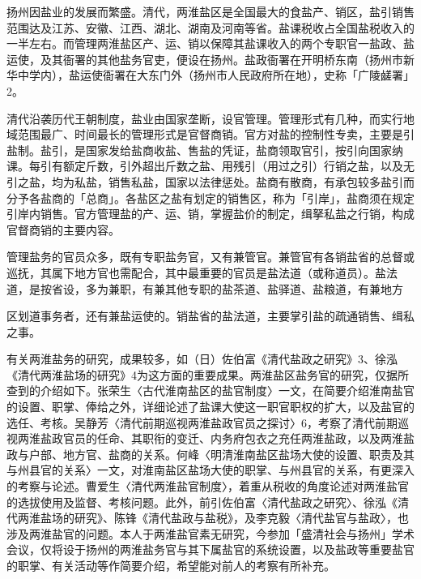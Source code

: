 扬州因盐业的发展而繁盛。清代，两淮盐区是全国最大的食盐产、销区，盐引销售范围达及江苏、安徽、江西、湖北、湖南及河南等省。盐课税收占全国盐税收入的一半左右。而管理两淮盐区产、运、销以保障其盐课收入的两个专职官一盐政、盐运使，及其衙署的其他盐务官吏，便设在扬州。盐政衙署在开明桥东南（扬州市新华中学内），盐运使衙署在大东门外（扬州市人民政府所在地），史称「广陵鹾署」2。

清代沿袭历代王朝制度，盐业由国家垄断，设官管理。管理形式有几种，而实行地域范围最广、时间最长的管理形式是官督商销。官方对盐的控制性专卖，主要是引盐制。盐引，是国家发给盐商收盐、售盐的凭证，盐商领取官引，按引向国家纳课。每引有额定斤数，引外超出斤数之盐、用残引（用过之引）行销之盐，以及无引之盐，均为私盐，销售私盐，国家以法律惩处。盐商有散商，有承包较多盐引而分予各盐商的「总商」。各盐区之盐有划定的销售区，称为「引岸」，盐商须在规定引岸内销售。官方管理盐的产、运、销，掌握盐价的制定，缉拏私盐之行销，构成官督商销的主要内容。

管理盐务的官员众多，既有专职盐务官，又有兼管官。兼管官有各销盐省的总督或巡抚，其属下地方官也需配合，其中最重要的官员是盐法道（或称道员）。盐法道，是按省设，多为兼职，有兼其他专职的盐茶道、盐驿道、盐粮道，有兼地方

\vfill
\begin{BookNotes}
\end{BookNotes}

\noindent 区划道事务者，还有兼盐运使的。销盐省的盐法道，主要掌引盐的疏通销售、缉私之事。

有关两淮盐务的研究，成果较多，如（日）佐伯富《清代盐政之研究》3、徐泓《清代两淮盐场的研究》4为这方面的重要成果。两淮盐区盐务官的研究，仅据所查到的介绍如下。张荣生〈古代淮南盐区的盐官制度〉一文，在简要介绍淮南盐官的设置、职掌、俸给之外，详细论述了盐课大使这一职官职权的扩大，以及盐官的选任、考核。吴静芳〈清代前期巡视两淮盐政官员之探讨〉6，考察了清代前期巡视两淮盐政官员的任命、其职衔的变迁、内务府包衣之充任两淮盐政，以及两淮盐政与户部、地方官、盐商的关系。何峰〈明清淮南盐区盐场大使的设置、职责及其与州县官的关系〉一文，对淮南盐区盐场大使的职掌、与州县官的关系，有更深入的考察与论述。曹爱生〈清代两淮盐官制度〉，着重从税收的角度论述对两淮盐官的选拔使用及监督、考核问题。此外，前引佐伯富〈清代盐政之研究〉、徐泓《清代两淮盐场的研究》、陈锋《清代盐政与盐税》，及李克毅〈清代盐官与盐政〉，也涉及两淮盐官的问题。本人于两淮盐官素无研究，今参加「盛清社会与扬州」学术会议，仅将设于扬州的两淮盐务官与其下属盐官的系统设置，以及盐政等重要盐官的职掌、有关活动等作简要介绍，希望能对前人的考察有所补充。

